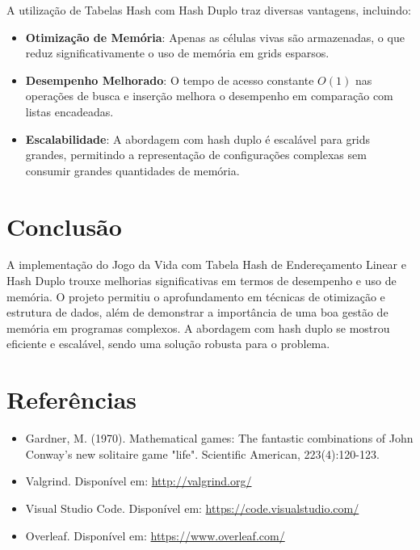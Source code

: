 \documentclass[a4paper,12pt]{article}
\begin{document}
A utilização de Tabelas Hash com Hash Duplo traz diversas vantagens, incluindo:
\begin{itemize}
    \item \textbf{Otimização de Memória}: Apenas as células vivas são armazenadas, o que reduz significativamente o uso de memória em grids esparsos.
    \item \textbf{Desempenho Melhorado}: O tempo de acesso constante \(O(1)\) nas operações de busca e inserção melhora o desempenho em comparação com listas encadeadas.
    \item \textbf{Escalabilidade}: A abordagem com hash duplo é escalável para grids grandes, permitindo a representação de configurações complexas sem consumir grandes quantidades de memória.
\end{itemize}

\section{Conclusão}
A implementação do Jogo da Vida com Tabela Hash de Endereçamento Linear e Hash Duplo trouxe melhorias significativas em termos de desempenho e uso de memória. O projeto permitiu o aprofundamento em técnicas de otimização e estrutura de dados, além de demonstrar a importância de uma boa gestão de memória em programas complexos. A abordagem com hash duplo se mostrou eficiente e escalável, sendo uma solução robusta para o problema.

\section{Referências}
\begin{itemize}
    \item Gardner, M. (1970). Mathematical games: The fantastic combinations of John Conway's new solitaire game "life". Scientific American, 223(4):120-123.
    \item Valgrind. Disponível em: \url{http://valgrind.org/}
    \item Visual Studio Code. Disponível em: \url{https://code.visualstudio.com/}
    \item Overleaf. Disponível em: \url{https://www.overleaf.com/}
\end{itemize}
\end{document}
